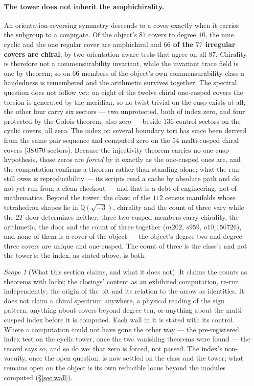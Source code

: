 \documentclass[11pt,a4paper]{article}
\theoremstyle{definition}
\theoremstyle{remark}
\newtheorem{scopenote}{Scope}
\newcommand{\Q}{\mathbb{Q}}
\begin{document}
\paragraph{The tower does not inherit the amphichirality.} An orientation-reversing symmetry descends to a cover exactly
when it carries the subgroup to a conjugate. Of the object's $87$ covers to degree $10$, the nine cyclic and the
one regular cover are amphichiral and \textbf{$66$ of the $77$ irregular covers are chiral}, by two
orientation-aware tests that agree on all $87$. Chirality is therefore not a commensurability invariant, while the invariant trace field is one by theorem; so on
$66$ members of the object's own commensurability class a handedness is remembered and the arithmetic survives together.
The spectral question does not follow yet: on eight of the twelve chiral one-cusped covers the torsion is
generated by the meridian, so no twist trivial on the cusp exists at all; the other four carry six sectors --- two
unprotected, both of index zero, and four protected by the Galois theorem, also zero --- beside $136$ control
sectors on the cyclic covers, all zero. The index on several boundary tori has since been derived from the same pair sequence and computed zero on the $54$ multi-cusped chiral covers ($38\,070$ sectors). Because the injectivity theorem carries no one-cusp hypothesis, those zeros are \emph{forced} by it exactly as the one-cusped ones are, and the computation confirms a theorem rather than standing alone; what the run still owes is reproducibility --- its scripts read a cache by absolute path and do not yet run from a clean checkout --- and that is a debt of engineering, not of mathematics. Beyond the tower, the class: of the $112$ census manifolds whose tetrahedron shapes lie in $\Q(\sqrt{-3})$, chirality and the count of three vary while the $2T$ door determines neither; three two-cusped members carry chirality, the arithmetic, the door and the count of three together ($m202$, $s959$, $o10\_150726$), and none of them is a cover of the object --- the object's degree-two and degree-three covers are unique and one-cusped. The count of three is the class's and not the tower's; the index, as stated above, is both.

\begin{scopenote}[What this section claims, and what it does not]
It claims the counts as theorems with locks; the closings' content as an exhibited computation, re-run
independently; the origin of the bit and its relation to the arrow as identities. It does not claim a chiral
spectrum anywhere, a physical reading of the sign pattern, anything about covers beyond degree ten, or anything
about the multi-cusped index before it is computed. Each wall in it is stated with its control. Where a computation could not have gone the other way --- the
pre-registered index test on the cyclic tower, once the two vanishing theorems were found --- the record says
so, and so do we: that zero is forced, not passed. The index's non-vacuity, once the open question, is now settled on the class and the tower; what remains open on the object is its own reducible locus beyond the modules computed (\S\ref{sec:wall}).
\end{scopenote}
\end{document}
